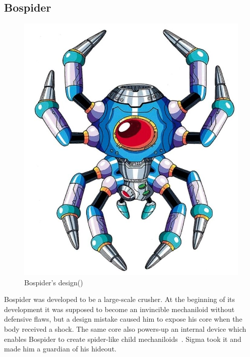 \subsection{Bospider}\label{boss:bospider}
\begin{figure}[htp]
	\centering
	\includegraphics[width=0.35\linewidth]{figures/X1/Sigma_stages/Bospider.jpg}
	\caption{Bospider's design(\cite{book:MMX_Complete_art})}
\end{figure}
Bospider was developed to be a large-scale crusher. At the beginning of its development it was supposed to become an invincible mechaniloid without defensive flaws, but a design mistake caused him to expose his core when the body received a shock. The same core also powers-up an internal device which enables Bospider to create spider-like child mechaniloids~\cite{wayback:X_resources}. Sigma took it and made him a guardian of his hideout.

